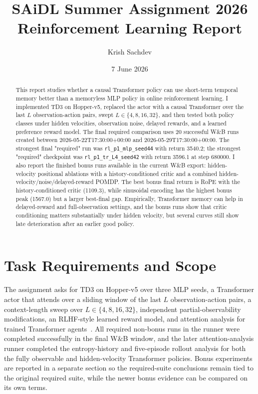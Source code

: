 \documentclass[11pt]{article}
\title{SAiDL Summer Assignment 2026\\Reinforcement Learning Report}
\author{Krish Sachdev}
\date{7 June 2026}
\begin{document}
\maketitle

\begin{abstract}
This report studies whether a causal Transformer policy can use short-term temporal memory better than a memoryless MLP policy in online reinforcement learning. I implemented TD3 on Hopper-v5, replaced the actor with a causal Transformer over the last $L$ observation-action pairs, swept $L \in \{4,8,16,32\}$, and then tested both policy classes under hidden velocities, observation noise, delayed rewards, and a learned preference reward model. The final required comparison uses 20 successful W\&B runs created between 2026-05-22T17:30:00+00:00 and 2026-05-29T17:30:00+00:00. The strongest final "required" run was \texttt{rl\_p1\_mlp\_seed44} with return 3540.2; the strongest "required" checkpoint was \texttt{rl\_p1\_tr\_L4\_seed42} with return 3596.1 at step 680000. I also report the finished bonus runs available in the current W\&B export: hidden-velocity positional ablations with a history-conditioned critic and a combined hidden-velocity/noise/delayed-reward POMDP. The best bonus final return is RoPE with the history-conditioned critic (1109.3), while sinusoidal encoding has the highest bonus peak (1567.0) but a larger best-final gap. Empirically, Transformer memory can help in delayed-reward and full-observation settings, and the bonus runs show that critic conditioning matters substantially under hidden velocity, but several curves still show late deterioration after an earlier good policy.
\end{abstract}

\section{Task Requirements and Scope}

The assignment asks for TD3 on Hopper-v5 over three MLP seeds, a Transformer actor that attends over a sliding window of the last $L$ observation-action pairs, a context-length sweep over $L \in \{4,8,16,32\}$, independent partial-observability modifications, an RLHF-style learned reward model, and attention analysis for trained Transformer agents~\cite{saidl2026}. All required non-bonus runs in the runner were completed successfully in the final W\&B window, and the later attention-analysis runner completed the entropy-history and five-episode rollout analysis for both the fully observable and hidden-velocity Transformer policies. Bonus experiments are reported in a separate section so the required-suite conclusions remain tied to the original required suite, while the newer bonus evidence can be compared on its own terms.
\end{document}
